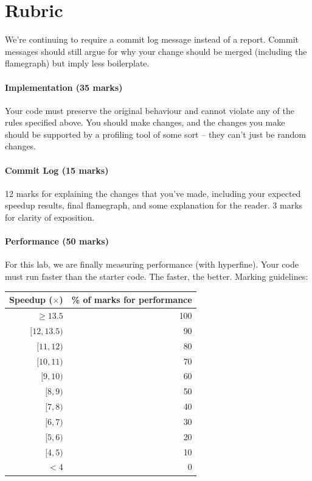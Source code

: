 \section*{Rubric}
We're continuing to require a commit log message instead of a report. Commit messages should still argue for why your change should be merged (including the flamegraph) but imply less boilerplate.

\paragraph{Implementation (35 marks)} Your code must preserve the original behaviour and cannot violate any of the rules specified above. You should make changes, and the changes you make should be supported by a profiling tool of some sort -- they can't just be random changes.

\paragraph{Commit Log (15 marks)} 12 marks for explaining the changes that you've made, including your expected speedup results, final flamegraph, and some explanation for the reader. 3 marks for clarity of exposition. 

\paragraph{Performance (50 marks)} For this lab, we are finally measuring performance (with hyperfine). Your code must run faster than the starter code. The faster, the better. Marking guidelines:

\begin{center}
\begin{tabular}{r|r}
\textbf{Speedup ($\times$)} & \textbf{\% of marks for performance}\\ \hline
$\geq 13.5$ & 100\\
$[12, 13.5)$ & 90\\
$[11, 12)$ & 80\\
$[10, 11)$ & 70\\
$[9, 10)$ & 60\\
$[8, 9)$ & 50\\
$[7, 8)$ & 40 \\
$[6, 7)$ & 30\\
$[5, 6)$ & 20\\
$[4, 5)$ & 10\\
$< 4$ & 0
\end{tabular}
\end{center}

